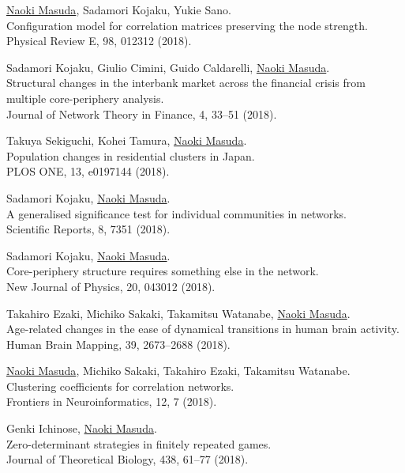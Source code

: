 \documentclass[11pt,letter]{article}
\begin{document}
\begin{etaremune}
\item \underline{Naoki Masuda}, Sadamori Kojaku, Yukie Sano.\\
Configuration model for correlation matrices preserving the node strength.\\
Physical Review E, 98, 012312 (2018).

\item Sadamori Kojaku, Giulio Cimini, Guido Caldarelli, \underline{Naoki Masuda}.\\
Structural changes in the interbank market across the financial crisis from multiple core-periphery analysis.\\
Journal of Network Theory in Finance, 4, 33--51 (2018).

\item Takuya Sekiguchi, Kohei Tamura, \underline{Naoki Masuda}.\\
Population changes in residential clusters in Japan.\\
PLOS ONE, 13, e0197144 (2018).

\item Sadamori Kojaku, \underline{Naoki Masuda}.\\
A generalised significance test for individual communities in networks.\\
Scientific Reports, 8, 7351 (2018).

\item Sadamori Kojaku, \underline{Naoki Masuda}.\\
Core-periphery structure requires something else in the network.\\
New Journal of Physics, 20, 043012 (2018).

\item Takahiro Ezaki, Michiko Sakaki, Takamitsu Watanabe, \underline{Naoki Masuda}.\\
Age-related changes in the ease of dynamical transitions in human brain activity.\\
Human Brain Mapping, 39, 2673--2688 (2018).

\item \underline{Naoki Masuda}, Michiko Sakaki, Takahiro Ezaki, Takamitsu Watanabe.\\
Clustering coefficients for correlation networks.\\
Frontiers in Neuroinformatics, 12, 7 (2018).

\item Genki Ichinose, \underline{Naoki Masuda}.\\
Zero-determinant strategies in finitely repeated games.\\
Journal of Theoretical Biology, 438, 61--77 (2018).


\end{etaremune}
\end{document}
